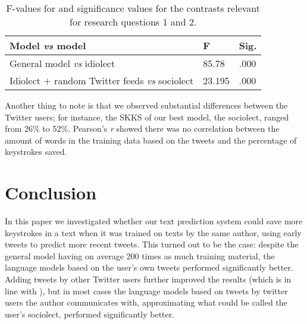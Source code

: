 \documentclass[11pt]{article}
\begin{document}
\begin{table}[t]
\begin{center}
\begin{tabular}{p{4.5cm}|ll} 
Model \emph{vs} model & F & Sig.\\
\hline 
General model \emph{vs} idiolect & 85.78 & .000\\ 
Idiolect $+$ random Twitter feeds \emph{vs} sociolect & 23.195 & .000\\
\end{tabular}
\caption{F-values for and significance values for the contrasts relevant for research questions 1 and 2.}
\label{stat}
\end{center}
\end{table}

 Another thing to note is that we observed substantial differences between the Twitter users; for instance, the SKKS of our best model, the sociolect, ranged from 26\% to 52\%. Pearson's \emph{r} showed there was no correlation between the amount of words in the training data based on the tweets and the percentage of keystrokes saved.

\section{Conclusion}
In this paper we investigated whether our text prediction system could save more keystrokes in a text when it was trained on texts by the same author, using early tweets to predict more recent tweets. This turned out to be the case: despite the general model having on average 200 times as much training material, the language models based on the user's own tweets performed significantly better. Adding tweets by other Twitter users further improved the results (which is in line with \cite{verberne12}), but in most cases the language models based on tweets by twitter users the author communicates with, approximating what could be called the user's sociolect, performed significantly better.



\end{document}
